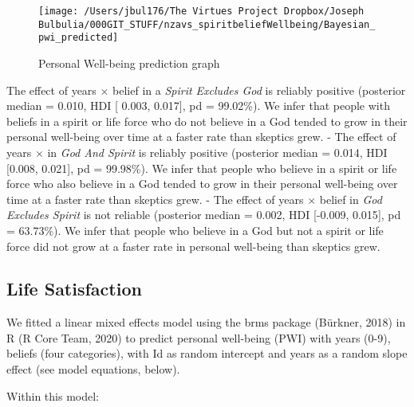 \documentclass[
  english,
  man,floatsintext]{apa6}
\begin{document}
\begin{figure}
\texttt{[image: /Users/jbul176/The Virtues Project Dropbox/Joseph Bulbulia/000GIT\_STUFF/nzavs\_spiritbeliefWellbeing/Bayesian\_pwi\_predicted]} \caption{Personal Well-being prediction graph}\label{fig:unnamed-chunk-2}
\end{figure}

The effect of years \(\times\) belief in a \emph{Spirit Excludes God} is reliably positive (posterior median = 0.010, HDI {[} 0.003, 0.017{]}, pd = 99.02\%). We infer that people with beliefs in a spirit or life force who do not believe in a God tended to grow in their personal well-being over time at a faster rate than skeptics grew.
- The effect of years \(\times\) in \emph{God And Spirit} is reliably positive (posterior median = 0.014, HDI {[}0.008, 0.021{]}, pd = 99.98\%). We infer that people who believe in a spirit or life force who also believe in a God tended to grow in their personal well-being over time at a faster rate than skeptics grew.
- The effect of years \(\times\) belief in \emph{God Excludes Spirit} is not reliable (posterior median = 0.002, HDI {[}-0.009, 0.015{]}, pd = 63.73\%). We infer that people who believe in a God but not a spirit or life force did not grow at a faster rate in personal well-being than skeptics grew.

\hypertarget{life-satisfaction-1}{%
\subsection{Life Satisfaction}\label{life-satisfaction-1}}

We fitted a linear mixed effects model using the brms package (Bürkner, 2018) in R (R Core Team, 2020) to predict personal well-being (PWI) with years (0-9), beliefs (four categories), with Id as random intercept and years as a random slope effect (see model equations, below).

Within this model:
\end{document}

